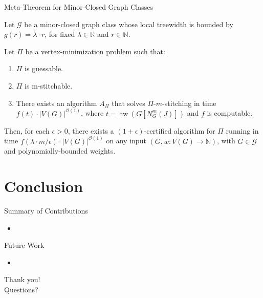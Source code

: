 \documentclass{beamer}
\newcommand{\tw}{\operatorname{tw}}
\begin{document}
\begin{frame}{Meta-Theorem for Minor-Closed Graph Classes}
\begin{definition}
Let $\mathcal{G}$ be a minor-closed graph class whose local treewidth is bounded by $g(r) = \lambda \cdot r$, for fixed $\lambda \in \mathbb{R}$ and $r \in \mathbb{N}$.

Let $\Pi$ be a vertex-minimization problem such that:
\begin{enumerate}
    \item $\Pi$ is guessable.
    \item $\Pi$ is m-stitchable.
    \item There exists an algorithm $A_\Pi$ that solves $\Pi$-$m$-stitching in time 
    $f(t) \cdot |V(G)|^{\mathcal{O}(1)}$, where $t = \tw(G[N_G^m(J)])$ and $f$ is computable.
\end{enumerate}

Then, for each $\epsilon > 0$, there exists a $(1 + \epsilon)$-certified algorithm for $\Pi$ 
running in time $f(\lambda \cdot m / \epsilon) \cdot |V(G)|^{\mathcal{O}(1)}$ on any input 
$(G, w : V(G) \to \mathbb{N})$, with $G \in \mathcal{G}$ and polynomially-bounded weights.
\end{definition}
\end{frame}


\section{Conclusion}

\begin{frame}{Summary of Contributions}
  \begin{itemize}
    \item 
  \end{itemize}
\end{frame}

\begin{frame}{Future Work}
  \begin{itemize}
    \item 
  \end{itemize}
\end{frame}

\begin{frame}
  \centering
  \Huge Thank you!\\
  \vspace{0.5cm}
  \Large Questions?
\end{frame}
\end{document}
